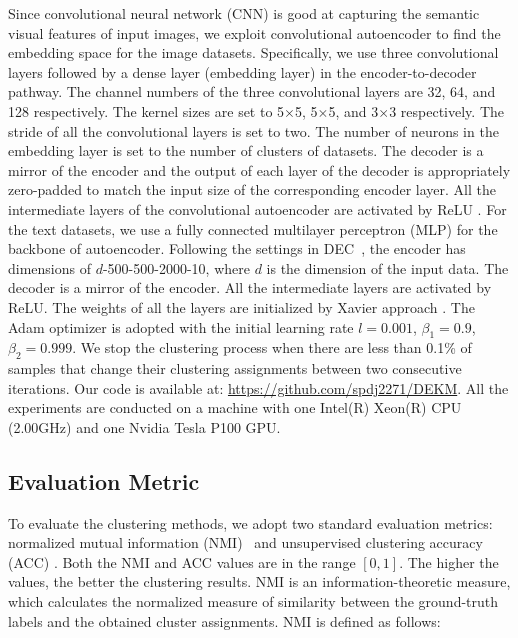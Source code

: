 Since convolutional neural network (CNN) is good at capturing the semantic visual features of input images, we exploit convolutional autoencoder to find the embedding space for the image datasets. Specifically, we use three convolutional layers followed by a dense layer (embedding layer) in the encoder-to-decoder pathway. The channel numbers of the three convolutional layers are 32, 64, and 128 respectively. The kernel sizes are set to 5$\times$5, 5$\times$5, and 3$\times$3 respectively. The stride of all the convolutional layers is set to two. The number of neurons in the embedding layer is set to the number of clusters of datasets. The decoder is a mirror of the encoder and the output of each layer of the decoder is appropriately zero-padded to match the input size of the corresponding encoder layer. All the intermediate layers of the convolutional autoencoder are activated by ReLU \cite{krizhevsky2012imagenet}. For the text datasets, we use a fully connected multilayer perceptron (MLP) for the backbone of autoencoder. Following the settings in DEC~\cite{DEC_xie2016unsupervised}, the encoder has dimensions of $d$-500-500-2000-10, where $d$ is the dimension of the input data. The decoder is a mirror of the encoder. All the intermediate layers are activated by ReLU. The weights of all the layers are initialized by Xavier approach \cite{glorot2010understanding}. The Adam \cite{kingma2014adam} optimizer is adopted with the initial learning rate  $l=0.001$, ${\beta_1} = 0.9$, ${\beta_2} = 0.999$. 
We stop the clustering process when there are less than 0.1\% of samples that change their clustering assignments between two consecutive iterations. Our code is available at: \textcolor{blue}{\url{https://github.com/spdj2271/DEKM}}. All the experiments are conducted on a machine with one Intel(R) Xeon(R) CPU (2.00GHz) and one Nvidia Tesla P100 GPU.



\subsection{Evaluation Metric}

To evaluate the clustering methods, we adopt two standard evaluation metrics: normalized mutual information (NMI)~\cite{vinh2010information} and unsupervised clustering accuracy (ACC) \cite{xu2003document}. Both the NMI and ACC values are in the range $\left[ 0, 1\right] $. The higher the values, the better the clustering results. NMI is an information-theoretic measure, which calculates the normalized measure of similarity between the ground-truth labels and the obtained cluster assignments. NMI is defined as follows:

